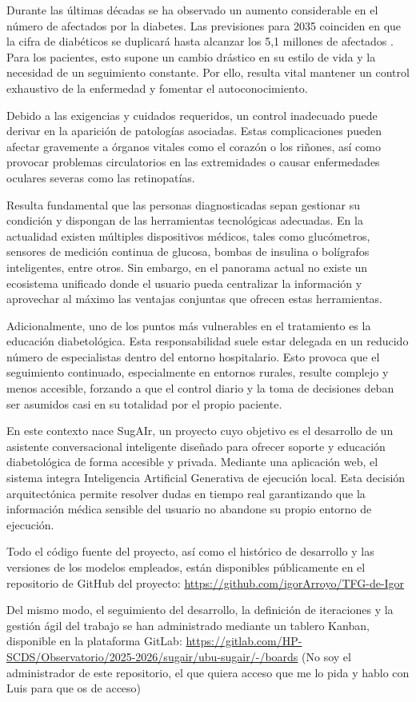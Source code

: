 Durante las últimas décadas se ha observado un aumento considerable en el número de afectados por la diabetes. Las previsiones para 2035 coinciden en que la cifra de diabéticos se duplicará hasta alcanzar los 5,1 millones de afectados \cite{idf_atlas_diabetes}. Para los pacientes, esto supone un cambio drástico en su estilo de vida y la necesidad de un seguimiento constante. Por ello, resulta vital mantener un control exhaustivo de la enfermedad y fomentar el autoconocimiento.

Debido a las exigencias y cuidados requeridos, un control inadecuado puede derivar en la aparición de patologías asociadas. Estas complicaciones pueden afectar gravemente a órganos vitales como el corazón o los riñones, así como provocar problemas circulatorios en las extremidades o causar enfermedades oculares severas como las retinopatías.

Resulta fundamental que las personas diagnosticadas sepan gestionar su condición y dispongan de las herramientas tecnológicas adecuadas. En la actualidad existen múltiples dispositivos médicos, tales como glucómetros, sensores de medición continua de glucosa, bombas de insulina o bolígrafos inteligentes, entre otros. Sin embargo, en el panorama actual no existe un ecosistema unificado donde el usuario pueda centralizar la información y aprovechar al máximo las ventajas conjuntas que ofrecen estas herramientas. 

Adicionalmente, uno de los puntos más vulnerables en el tratamiento es la educación diabetológica. Esta responsabilidad suele estar delegada en un reducido número de especialistas dentro del entorno hospitalario. Esto provoca que el seguimiento continuado, especialmente en entornos rurales, resulte complejo y menos accesible, forzando a que el control diario y la toma de decisiones deban ser asumidos casi en su totalidad por el propio paciente.

En este contexto nace SugAIr, un proyecto cuyo objetivo es el desarrollo de un asistente conversacional inteligente diseñado para ofrecer soporte y educación diabetológica de forma accesible y privada. Mediante una aplicación web, el sistema integra Inteligencia Artificial Generativa de ejecución local. Esta decisión arquitectónica permite resolver dudas en tiempo real garantizando que la información médica sensible del usuario no abandone su propio entorno de ejecución.

Todo el código fuente del proyecto, así como el histórico de desarrollo y las versiones de los modelos empleados, están disponibles públicamente en el repositorio de GitHub del proyecto: 
\url{https://github.com/igorArroyo/TFG-de-Igor}

Del mismo modo, el seguimiento del desarrollo, la definición de iteraciones y la gestión ágil del trabajo se han administrado mediante un tablero Kanban, disponible en la plataforma GitLab:
\url{https://gitlab.com/HP-SCDS/Observatorio/2025-2026/sugair/ubu-sugair/-/boards}
(No soy el administrador de este repositorio, el que quiera acceso que me lo pida y hablo con Luis para que os de acceso)



